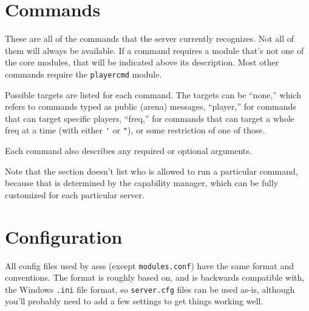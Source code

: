 \documentclass{article}
\newcommand{\asss}{asss}
\begin{document}
%
%


\section{Commands}

These are all of the commands that the server currently recognizes. Not
all of them will always be available. If a command requires a module
that's not one of the core modules, that will be indicated above its
description. Most other commands require the \texttt{playercmd} module.

Possible targets are listed for each command. The targets can be
``none,'' which refers to commands typed as public (arena) messages,
``player,'' for commands that can target specific players, ``freq,'' for
commands that can target a whole freq at a time (with either \verb/'/ or
\verb/"/), or some restriction of one of those.

Each command also describes any required or optional arguments.

Note that the section doesn't list who is allowed to run a particular
command, because that is determined by the capability manager, which can
be fully customized for each particular server.




\section{Configuration}

All config files used by \asss{} (except \verb/modules.conf/) have the
same format and conventions. The format is roughly based on, and is
backwards compatible with, the Windows \verb/.ini/ file format, so
\verb/server.cfg/ files can be used as-is, although you'll probably need
to add a few settings to get things working well.
\end{document}

